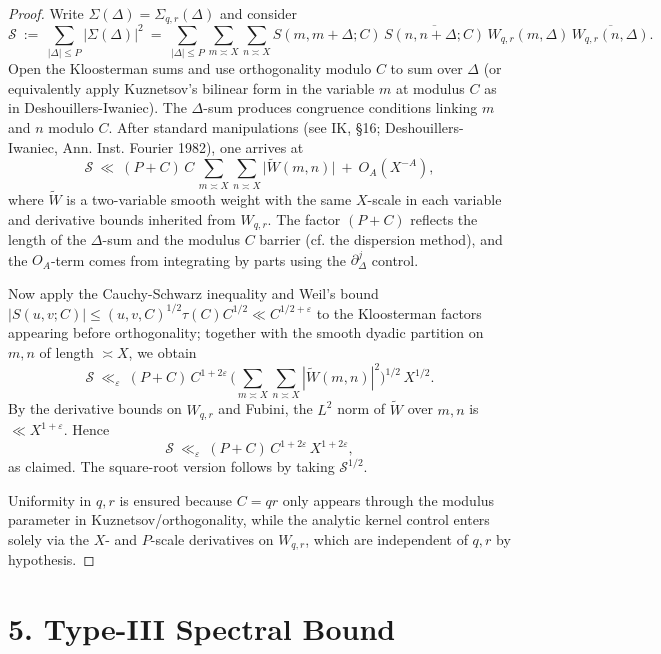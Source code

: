 \documentclass[11pt]{article}
\theoremstyle{definition}
\theoremstyle{remark}
\begin{document}
\begin{proof}
Write $\Sigma(\Delta)=\Sigma_{q,r}(\Delta)$ and consider
\[
\mathcal S\ :=\ \sum_{|\Delta|\le P}\big|\Sigma(\Delta)\big|^2
\ =\ \sum_{|\Delta|\le P}\sum_{m\asymp X}\sum_{n\asymp X} S(m,m+\Delta;C)\,\overline{S(n,n+\Delta;C)}\,W_{q,r}(m,\Delta)\,\overline{W_{q,r}(n,\Delta)}.
\]
Open the Kloosterman sums and use orthogonality modulo $C$ to sum over $\Delta$ (or equivalently apply Kuznetsov’s bilinear form in the variable $m$ at modulus $C$ as in Deshouillers-Iwaniec). The $\Delta$-sum produces congruence conditions linking $m$ and $n$ modulo $C$. After standard manipulations (see IK, §16; Deshouillers-Iwaniec, Ann. Inst. Fourier 1982), one arrives at
\[
\mathcal S\ \ll\ (P+C)\,C\,\sum_{m\asymp X}\sum_{n\asymp X}\big|\widetilde W(m,n)\big|\ +\ O_A(X^{-A}),
\]
where $\widetilde W$ is a two-variable smooth weight with the same $X$-scale in each variable and derivative bounds inherited from $W_{q,r}$. The factor $(P+C)$ reflects the length of the $\Delta$-sum and the modulus $C$ barrier (cf. the dispersion method), and the $O_A$-term comes from integrating by parts using the $\partial_\Delta^j$ control.

Now apply the Cauchy-Schwarz inequality and Weil’s bound $|S(u,v;C)|\le (u,v,C)^{1/2}\tau(C)C^{1/2}\ll C^{1/2+\varepsilon}$ to the Kloosterman factors appearing before orthogonality; together with the smooth dyadic partition on $m,n$ of length $\asymp X$, we obtain
\[
\mathcal S\ \ll_{\varepsilon}\ (P+C)\,C^{1+2\varepsilon}\,\Big(\sum_{m\asymp X}\sum_{n\asymp X}|\widetilde W(m,n)|^2\Big)^{1/2}\,X^{1/2}.
\]
By the derivative bounds on $W_{q,r}$ and Fubini, the $L^2$ norm of $\widetilde W$ over $m,n$ is $\ll X^{1+\varepsilon}$. Hence
\[
\mathcal S\ \ll_{\varepsilon}\ (P+C)\,C^{1+2\varepsilon}\,X^{1+2\varepsilon},
\]
as claimed. The square-root version follows by taking $\mathcal S^{1/2}$.

Uniformity in $q,r$ is ensured because $C=qr$ only appears through the modulus parameter in Kuznetsov/orthogonality, while the analytic kernel control enters solely via the $X$- and $P$-scale derivatives on $W_{q,r}$, which are independent of $q,r$ by hypothesis.
\end{proof}



\section*{5. Type-III Spectral Bound}
\end{document}
